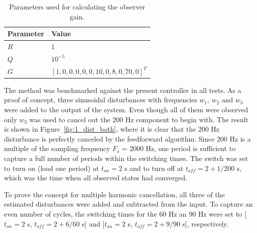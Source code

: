 \begin{table}[h!]
  \centering
  \begin{tabular}{| l | l |}
    \hline
    Parameter & Value \\ \hline
    $R$ & $1$ \\
    $Q$ & $10^{-5}$ \\
    $G$ & $[1, 0, 0, 0, 0, 0, 10, 0, 8, 0, 70, 0]^T$ \\
    \hline
  \end{tabular}
  \caption{\label{tab:kalman} Parameters used for calculating the observer gain.}
\end{table}

The \abbrRFDC method was benchmarked against the present controller in all tests. As a proof of concept, three sinusoidal disturbances with frequencies $w_1$, $w_2$ and $w_3$ were added to the output of the system. Even though all of them were observed only $w_3$ was used to cancel out the 200 Hz component to begin with. The result is shown in Figure~\ref{fig:1_dist_both}, where it is clear that the 200 Hz disturbance is perfectly canceled by the feedforward algorithm. Since 200 Hz is a multiple of the sampling frequency $F_s$ = 2000 Hz, one period is sufficient to capture a full number of periods within the switching times. The switch was set to turn on (load one period) at $t_{on} = 2$ s and to turn off at $t_{off} = 2+1/200$ s, which was the time when all observed states had converged.

To prove the concept for multiple harmonic cancellation, all three of the estimated disturbances were added and subtracted from the input. To capture an even number of cycles, the switching times for the 60 Hz an 90 Hz were set to [$t_{on} = 2$ s, $t_{off} = 2+6/60$ s] and [$t_{on} = 2$ s, $t_{off} = 2+9/90$ s], respectively.

